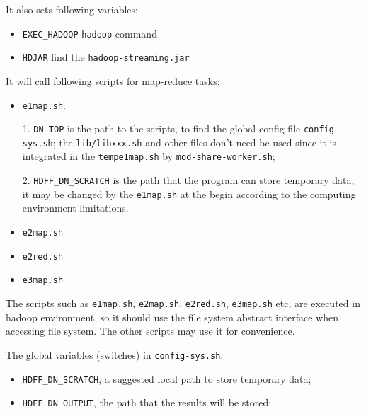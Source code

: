 \begin{itemize}
\begin{itemize}
\begin{itemize}
          It also sets following variables:
            \begin{itemize}
              \item \texttt{EXEC\_HADOOP} \texttt{hadoop} command
              \item \texttt{HDJAR} find the \texttt{hadoop-streaming.jar}
            \end{itemize}


          It will call following scripts for map-reduce tasks:
            \begin{itemize}
              \item \texttt{e1map.sh}:

                1. \texttt{DN\_TOP} is the path to the scripts, to find the global config file \texttt{config-sys.sh}; the \texttt{lib/libxxx.sh} and other files don't need be used since it is integrated in the \texttt{tempe1map.sh} by \texttt{mod-share-worker.sh};

                2. \texttt{HDFF\_DN\_SCRATCH} is the path that the program can store temporary data, it may be changed by the \texttt{e1map.sh} at the begin according to the computing environment limitations.

              \item \texttt{e2map.sh}
              \item \texttt{e2red.sh}
              \item \texttt{e3map.sh}
            \end{itemize}
        \end{itemize}

    \end{itemize}

\end{itemize}



The scripts such as \texttt{e1map.sh}, \texttt{e2map.sh}, \texttt{e2red.sh}, \texttt{e3map.sh} etc,
are executed in hadoop environment, so it should use the file system abstract interface when accessing file system.
The other scripts may use it for convenience.



The global variables (switches) in \texttt{config-sys.sh}:
\begin{itemize}
  \item \texttt{HDFF\_DN\_SCRATCH}, a suggested local path to store temporary data;

  \item \texttt{HDFF\_DN\_OUTPUT}, the path that the results will be stored;
\end{itemize}







